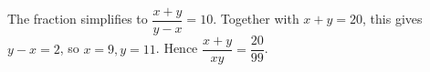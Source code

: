 The fraction simplifies to $\dfrac{x+y}{y-x}=10$. Together with $x+y=20$, this gives $y-x=2$, so $x=9,y=11$. Hence $\dfrac{x+y}{xy}=\boxed{\dfrac{20}{99}}$.
